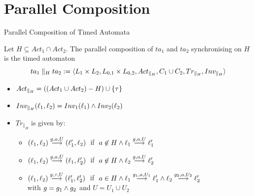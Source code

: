 \documentclass{beamer}
\begin{document}
\section{Parallel Composition}
\begin{slide}{Parallel Composition of Timed Automata}

  Let $H \subseteq Act_1 \cap Act_2$. The parallel composition of
  $ta_1$ and $ta_2$ synchronising on $H$ is the timed automaton
\begin{equation*}
ta_1 \parallel_H ta_2 := \mathopen{\langle}L_1 \times L_2, L_{0,1} \times L_{0,2}, Act_{\parallel_H}, C_1 \cup C_2, Tr_{\parallel_H}, Inv_{\parallel_H}\mathclose{\rangle}
\end{equation*}
\begin{itemize}
\item $Act_{\parallel_H} = ((Act_1 \cup Act_2) - H) \cup \mathopen{ \{ }\tau\mathclose{ \} }$
\item $Inv_{\parallel_H} (\ell_1,\ell_2) = Inv_1(\ell_1) \mathbin{\wedge}  Inv_2(\ell_2)$
\item $Tr_{\parallel_H}$ is given by:
\begin{itemize}
\item $(\ell_1,\ell_2) \stackrel{g,a,U}{\longrightarrow} (\ell'_1,\ell_2)\; $ if $\; a \not \in H \mathbin{\wedge}  \ell_1 \stackrel{g,a,U}{\longrightarrow} \ell'_1 $
\item $(\ell_1,\ell_2) \stackrel{g,a,U}{\longrightarrow} (\ell_1,\ell'_2)\; $ if $\; a \not \in H \mathbin{\wedge}   \ell_2 \stackrel{g,a,U}{\longrightarrow} \ell'_2$
\item $(\ell_1,\ell_2) \stackrel{g,\tau,U}{\longrightarrow} (\ell'_1,\ell'_2)\; $ if $\; a \in H \mathbin{\wedge}  \ell_1 \stackrel{g_1,a,U_1}{\longrightarrow} \ell'_1 \mathbin{\wedge} \ell_2 \stackrel{g_2,a,U_2}{\longrightarrow} \ell'_2$\\
with $g = g_1 \mathbin{\wedge} g_2$ and $U = U_1 \cup U_2$
\end{itemize}
\end{itemize}
\end{slide}
\end{document}
